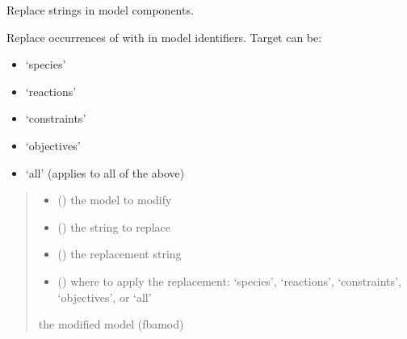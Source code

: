 \documentclass[letterpaper,12pt,english]{sphinxmanual}
\begin{document}
\begin{fulllineitems}
\label{\detokenize{api/core:cbmpy.CBTools.stringReplace}}
\pysigstartsignatures
\pysiglinewithargsret
{}
{\sphinxparamcomma {}\sphinxparamcomma {}\sphinxparamcomma {}}
{}
\pysigstopsignatures
\sphinxAtStartPar
Replace strings in model components.

\sphinxAtStartPar
Replace occurrences of  with  in model identifiers. Target can be:
\begin{itemize}
\item {} 
\sphinxAtStartPar
‘species’

\item {} 
\sphinxAtStartPar
‘reactions’

\item {} 
\sphinxAtStartPar
‘constraints’

\item {} 
\sphinxAtStartPar
‘objectives’

\item {} 
\sphinxAtStartPar
‘all’ (applies to all of the above)

\end{itemize}
\begin{quote}\begin{description}
\begin{itemize}
\item {} 
\sphinxAtStartPar
{} () \textendash{} the model to modify

\item {} 
\sphinxAtStartPar
{} () \textendash{} the string to replace

\item {} 
\sphinxAtStartPar
{} () \textendash{} the replacement string

\item {} 
\sphinxAtStartPar
{} () \textendash{} where to apply the replacement: ‘species’, ‘reactions’, ‘constraints’,
‘objectives’, or ‘all’

\end{itemize}

\sphinxAtStartPar
{} \textendash{} the modified model (fbamod)

\end{description}\end{quote}

\end{fulllineitems}
\end{document}
